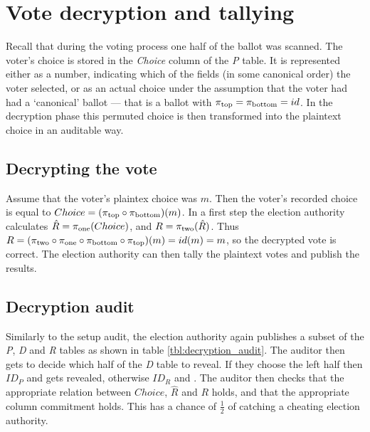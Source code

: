 \chapter{Vote decryption and tallying}

Recall that during the voting process one half of the ballot was scanned. The
voter's choice is stored in the \emph{Choice} column of the \emph{P} table. It
is represented either as a number, indicating which of the fields (in some
canonical order) the voter selected, or as an actual choice under the
assumption that the voter had had a `canonical' ballot --- that is a ballot
with $\pi_{\text{top}} = \pi_{\text{bottom}} = id$. In the decryption phase this permuted choice is
then transformed into the plaintext choice in an auditable way.

\section{Decrypting the vote}

Assume that the voter's plaintex choice was $m$. Then the voter's recorded
choice is equal to $Choice = (\pi_{\text{top}}{} \circ \pi_{\text{bottom}}{})(m)$. In a first step
the election authority calculates $\hat{R} = \pi_{\text{one}}{}(Choice)$, and $R =
\pi_{\text{two}}{}(\hat{R})$. Thus $R = (\pi_{\text{two}} \circ \pi_{\text{one}} \circ \pi_{\text{bottom}} \circ \pi_{\text{top}})(m)
= id(m) = m$, so the decrypted vote is correct. The election authority can then
tally the plaintext votes and publish the results.

\section{Decryption audit}

Similarly to the setup audit, the election authority again publishes a subset
of the \emph{P}, \emph{D} and \emph{R} tables as shown in table
\ref{tbl:decryption_audit}. The auditor then gets to decide which half of the
\emph{D} table to reveal. If they choose the left half then $ID_P$ and \pone{}
gets revealed, otherwise $ID_R$ and \ptwo{}. The auditor then checks that the
appropriate relation between $Choice$, $\hat{R}$ and $R$ holds, and that the
appropriate column commitment holds. This has a chance of $\frac{1}{2}$ of
catching a cheating election authority.

